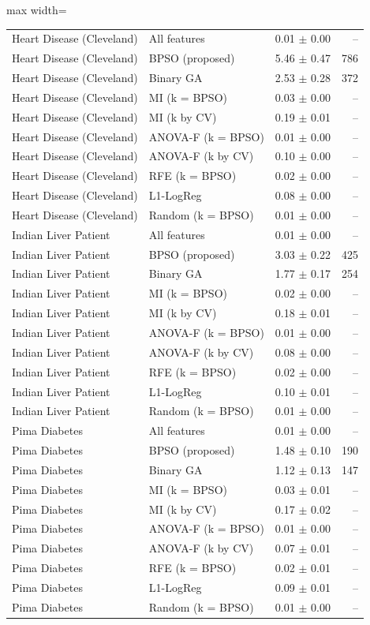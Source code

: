 \begin{table}[!t]
\begin{adjustbox}{max width=\linewidth}
\begin{tabular}{llrr}
Heart Disease (Cleveland) & All features & 0.01 $\pm$ 0.00 & -- \\
Heart Disease (Cleveland) & BPSO (proposed) & 5.46 $\pm$ 0.47 & 786 \\
Heart Disease (Cleveland) & Binary GA & 2.53 $\pm$ 0.28 & 372 \\
Heart Disease (Cleveland) & MI (k = BPSO) & 0.03 $\pm$ 0.00 & -- \\
Heart Disease (Cleveland) & MI (k by CV) & 0.19 $\pm$ 0.01 & -- \\
Heart Disease (Cleveland) & ANOVA-F (k = BPSO) & 0.01 $\pm$ 0.00 & -- \\
Heart Disease (Cleveland) & ANOVA-F (k by CV) & 0.10 $\pm$ 0.00 & -- \\
Heart Disease (Cleveland) & RFE (k = BPSO) & 0.02 $\pm$ 0.00 & -- \\
Heart Disease (Cleveland) & L1-LogReg & 0.08 $\pm$ 0.00 & -- \\
Heart Disease (Cleveland) & Random (k = BPSO) & 0.01 $\pm$ 0.00 & -- \\
Indian Liver Patient & All features & 0.01 $\pm$ 0.00 & -- \\
Indian Liver Patient & BPSO (proposed) & 3.03 $\pm$ 0.22 & 425 \\
Indian Liver Patient & Binary GA & 1.77 $\pm$ 0.17 & 254 \\
Indian Liver Patient & MI (k = BPSO) & 0.02 $\pm$ 0.00 & -- \\
Indian Liver Patient & MI (k by CV) & 0.18 $\pm$ 0.01 & -- \\
Indian Liver Patient & ANOVA-F (k = BPSO) & 0.01 $\pm$ 0.00 & -- \\
Indian Liver Patient & ANOVA-F (k by CV) & 0.08 $\pm$ 0.00 & -- \\
Indian Liver Patient & RFE (k = BPSO) & 0.02 $\pm$ 0.00 & -- \\
Indian Liver Patient & L1-LogReg & 0.10 $\pm$ 0.01 & -- \\
Indian Liver Patient & Random (k = BPSO) & 0.01 $\pm$ 0.00 & -- \\
Pima Diabetes & All features & 0.01 $\pm$ 0.00 & -- \\
Pima Diabetes & BPSO (proposed) & 1.48 $\pm$ 0.10 & 190 \\
Pima Diabetes & Binary GA & 1.12 $\pm$ 0.13 & 147 \\
Pima Diabetes & MI (k = BPSO) & 0.03 $\pm$ 0.01 & -- \\
Pima Diabetes & MI (k by CV) & 0.17 $\pm$ 0.02 & -- \\
Pima Diabetes & ANOVA-F (k = BPSO) & 0.01 $\pm$ 0.00 & -- \\
Pima Diabetes & ANOVA-F (k by CV) & 0.07 $\pm$ 0.01 & -- \\
Pima Diabetes & RFE (k = BPSO) & 0.02 $\pm$ 0.01 & -- \\
Pima Diabetes & L1-LogReg & 0.09 $\pm$ 0.01 & -- \\
Pima Diabetes & Random (k = BPSO) & 0.01 $\pm$ 0.00 & -- \\
\bottomrule
\end{tabular}
\end{adjustbox}
\end{table}

